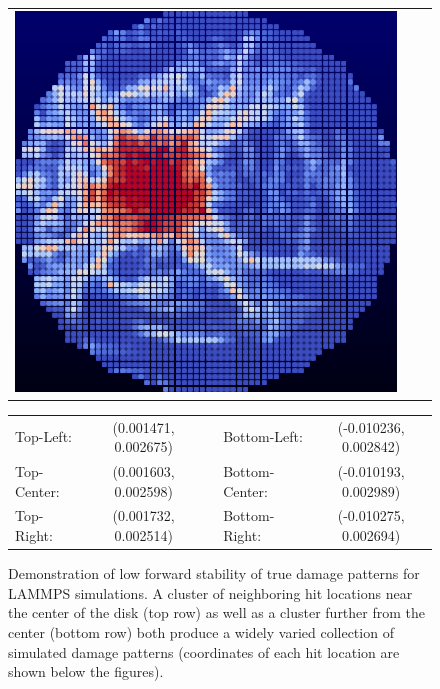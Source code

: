 \begin{figure}
\begin{tabular}{ccc}
  \includegraphics[scale=0.75]{figure/New_Solutions/true_soln_19051.eps} 
  \end{tabular}
  \begin{tabular}{lcclc}
  Top-Left:   &  (0.001471, 0.002675) & & Bottom-Left:   & (-0.010236, 0.002842) \\
  Top-Center: &  (0.001603, 0.002598) & & Bottom-Center: & (-0.010193, 0.002989) \\
  Top-Right:  &  (0.001732, 0.002514) & & Bottom-Right:  & (-0.010275, 0.002694) \\
  \end{tabular}
\caption{Demonstration of low forward stability of true damage patterns for LAMMPS simulations.  A cluster of neighboring hit locations near the center of the disk (top row) as well as a cluster further from the center (bottom row) both produce a widely varied collection of simulated damage patterns (coordinates of each hit location are shown below the figures).}
\label{fig:forward_solutions}       
\end{figure}


